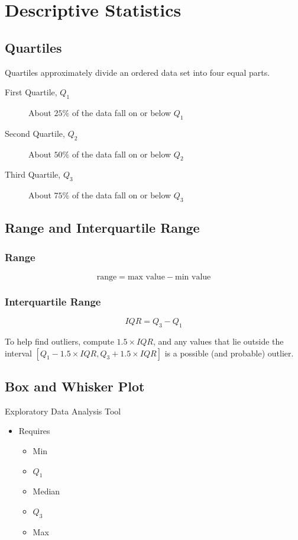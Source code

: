 \documentclass{book}
\begin{document}
\section{Descriptive Statistics}

\subsection{Quartiles}

Quartiles approximately divide an ordered data set into four equal parts.

\begin{description}
\item[First Quartile, $Q_1$]
About $25\%$ of the data fall on or below $Q_1$
\item[Second Quartile, $Q_2$]
About $50\%$ of the data fall on or below $Q_2$
\item[Third Quartile, $Q_3$]
About $75\%$ of the data fall on or below $Q_3$
\end{description}

\subsection{Range and Interquartile Range}

\subsubsection{Range}

$$\text{range} = \text{max value} - \text{min value}$$

\subsubsection{Interquartile Range}

$$IQR=Q_3 - Q_1$$

To help find outliers, compute $1.5 \times IQR$, and any values that lie outside the interval $[Q_1-1.5 \times IQR, Q_3+1.5 \times IQR]$ is a possible (and probable) outlier.

\subsection{Box and Whisker Plot}

Exploratory Data Analysis Tool

\begin{itemize}
\item Requires
	\begin{itemize}
	\item Min
	\item $Q_1$
	\item Median
	\item $Q_3$
	\item Max
	\end{itemize}
\end{itemize}
\end{document}
